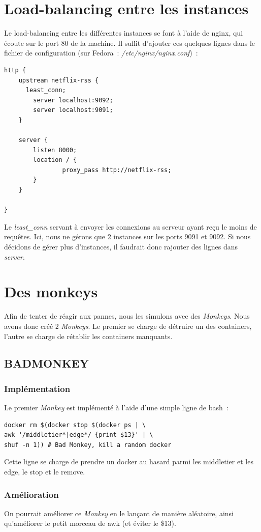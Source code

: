 \documentclass{report}
\begin{document}
	\section{Load-balancing entre les instances}

	Le load-balancing entre les différentes instances se font à l'aide de nginx, qui écoute sur le port 80 de la machine. Il suffit d'ajouter ces quelques lignes dans le fichier de configuration (sur Fedora~: \emph{/etc/nginx/nginx.conf})~:
	\begin{verbatim}
http {
	upstream netflix-rss {
      least_conn;
	    server localhost:9092;
	    server localhost:9091;
	}

	server {
	    listen 8000;
	    location / {
				proxy_pass http://netflix-rss;
	    }
	}

}
	\end{verbatim}
Le \emph{least\_conn} servant à envoyer les connexions au serveur ayant reçu le moins de requêtes. Ici, nous ne gérons que 2 instances sur les ports 9091 et 9092. Si nous décidons de gérer plus d'instances, il faudrait donc rajouter des lignes dans \emph{server}.



	\section{Des monkeys}
	Afin de tenter de réagir aux pannes, nous les simulons avec des \emph{Monkeys}. Nous avons donc créé 2 \emph{Monkeys}. Le premier se charge de détruire un des containers, l'autre se charge de rétablir les containers manquants.
	\subsection{BADMONKEY}
	\subsubsection{Implémentation}
	Le premier \emph{Monkey} est implémenté à l'aide d'une simple ligne de bash~:
	\begin{verbatim}
docker rm $(docker stop $(docker ps | \
awk '/middletier*|edge*/ {print $13}' | \
shuf -n 1)) # Bad Monkey, kill a random docker
	\end{verbatim}
	Cette ligne se charge de prendre un docker au hasard parmi les middletier et les edge, le stop et le remove.
	\subsubsection{Amélioration}
	On pourrait améliorer ce \emph{Monkey} en le lançant de manière aléatoire, ainsi qu'améliorer le petit morceau de awk (et éviter le \$13).
\end{document}

